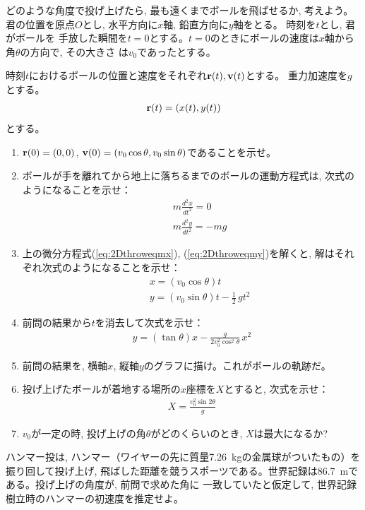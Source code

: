 \begin{q}\label{q:2Dthrow}
どのような角度で投げ上げたら, 最も遠くまでボールを飛ばせるか, 考えよう。
君の位置を原点$O$とし, 水平方向に$x$軸, 鉛直方向に$y$軸をとる。 時刻を$t$とし, 君がボールを
手放した瞬間を$t=0$とする。$t=0$のときにボールの速度は$x$軸から角$\theta$の方向で, その大きさ
は$v_0$であったとする。

時刻$t$におけるボールの位置と速度をそれぞれ${\bf r}(t), {\bf v}(t)$とする。
重力加速度を$g$とする。
\begin{eqnarray*}{\bf r}(t)=(x(t), y(t))\end{eqnarray*}
とする。
\begin{enumerate}
\item ${\bf r}(0)=(0, 0)$, ${\bf v}(0)=(v_0\cos\theta, v_0\sin\theta)$であることを示せ。
\item ボールが手を離れてから地上に落ちるまでのボールの運動方程式は, 
次式のようになることを示せ：
\begin{eqnarray}
&&m\frac{d^2x}{dt^2}=0\label{eq:2Dthroweqmx}\\
&&m\frac{d^2y}{dt^2}=-mg\label{eq:2Dthroweqmy}
\end{eqnarray}
\item 上の微分方程式(\ref{eq:2Dthroweqmx}), (\ref{eq:2Dthroweqmy})を解くと, 
解はそれぞれ次式のようになることを示せ：
\begin{eqnarray}
&&x=(v_0\cos\theta)t\\
&&y=(v_0\sin\theta)t-\frac{1}{2}\,gt^2
\end{eqnarray}
\item 前問の結果から$t$を消去して次式を示せ：
\begin{eqnarray}
y=(\tan\theta)x-\frac{g}{2v_0^2\cos^2\theta}\,x^2\label{eq:throwtilt}
\end{eqnarray}
\item 前問の結果を, 横軸$x$, 縦軸$y$のグラフに描け。これがボールの軌跡だ。
\item 投げ上げたボールが着地する場所の$x$座標を$X$とすると, 次式を示せ：
\begin{eqnarray}
X=\frac{v_0^2\sin2\theta}{g}\label{eq:throwtiltX}
\end{eqnarray}
\item $v_0$が一定の時, 投げ上げの角$\theta$がどのくらいのとき, $X$は最大になるか? 
\end{enumerate}
\end{q}
\vspace{0.2cm}

\begin{q}\label{q:2Dthrow_hammer}
ハンマー投は, ハンマー（ワイヤーの先に質量7.26~kgの金属球がついたもの）を振り回して投げ上げ, 
飛ばした距離を競うスポーツである。世界記録は86.7~mである。投げ上げの角度が, 前問で求めた角に
一致していたと仮定して, 世界記録樹立時のハンマーの初速度を推定せよ。
\end{q}
\hv


